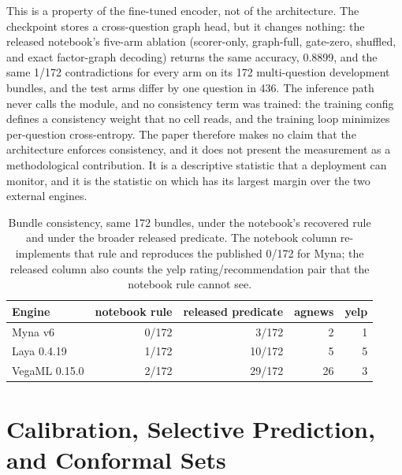 This is a property of the fine-tuned encoder, not of the architecture. The checkpoint stores a
cross-question graph head, but it changes nothing: the released notebook's five-arm ablation
(scorer-only, graph-full, gate-zero, shuffled, and exact factor-graph decoding) returns the same
accuracy, 0.8899, and the same 1/172 contradictions for every arm on its 172 multi-question
development bundles, and the test arms differ by one question in 436. The inference path never calls the module, and no consistency term
was trained: the training config defines a consistency weight that no cell reads, and the training
loop minimizes per-question cross-entropy. The paper therefore makes
no claim that the architecture enforces consistency, and it does not present the measurement as a
methodological contribution. It is a descriptive statistic
that a deployment can monitor, and it is the statistic on which \vsix{} has its largest margin
over the two external engines.

\begin{table}[t]
\centering
\footnotesize
\caption{Bundle consistency, same 172 bundles, under the notebook's recovered rule and under the
broader released predicate. The notebook column re-implements that rule and reproduces the
published 0/172 for Myna; the released column also counts the yelp rating/recommendation pair that
the notebook rule cannot see.}
\label{tab:consistency}
\begin{tabular}{lrrrr}
\toprule
Engine & notebook rule & released predicate & agnews & yelp \\
\midrule
Myna v6 & 0/172 & 3/172 & 2 & 1 \\
Laya 0.4.19 & 1/172 & 10/172 & 5 & 5 \\
VegaML 0.15.0 & 2/172 & 29/172 & 26 & 3 \\
\bottomrule
\end{tabular}
\end{table}

\section{Calibration, Selective Prediction, and Conformal Sets}
\label{sec:calibration}


